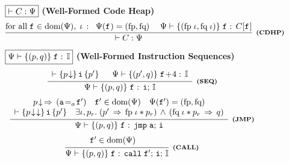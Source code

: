 \begin{figure*}[!thp]
	\subfigure
	{
		\begin{minipage}{1\linewidth}
			$\boxed{\vdash C : \Psi}$ \quad \quad
			\textbf{(Well-Formed Code Heap)}
			\[
				\infer[\tinybftext{(CDHP)}]
				{
					\vdash \code : \Psi
				}
				{
					\text{for all} \; \lab{} \in \dom(\Psi), \; \lgvl \, :
					\; \; \Psi(\lab{}) = (\specpre, \specpost) \quad \;
					\wfcblk{\specpre \; \lgvl}{\specpost \; \lgvl}{\lab{}}{C[\lab{}]}
				}
			\]
		\end{minipage}
	}
	
	\subfigure
	{
		\begin{minipage}{1\linewidth}
			$\boxed{\Psi \vdash \{({p}, {q})\} \; {\texttt{f}_{}} : \, {\mathbb{I}}}$ \quad \quad
			\textbf{(Well-Formed Instruction Sequences)}
%
			\[
				\infer[\tinybftext{(SEQ)}]
				{
					\wfcblk{\astP}{\astQ}{\lab{}}{\simplins; \, \cblk}
				}
				{
					\begin{array}{l}
						\wfins{\nxtAst{\astP}}{\simplins}{\astP'} \quad \; \;
						\wfcblk{\astP'}{\astQ}{\lab{}\!+\!4}{\cblk}
					\end{array}
				}
			\]
%
%
            \[
                \infer[\tinybftext{(JMP)}]
                {
                    \wfcblk{\astP}{\astQ}{\lab{}}{\jmp \; \aexp; \, \simplins}
                }
                {
                    \begin{array}{c}
                        \nxtAst{\astP}
                          \,\Rightarrow\, (\aexpeq{\aexp}{\lab{}'}) \quad
                        \lab{}' \in \dom(\Psi) \quad \Psi(\lab{}') = (\specpre, \specpost) \\
                        \wfins{\nxtAst{\nxtAst{\astP}}}{\simplins}{\astP'} \quad
                        \exists \lgvl,\pr. \;
                        (\astP' \,\Rightarrow\,
                        \specpre \; \lgvl * \pr)
                        \, \land \,
                        (\specpost \; \lgvl * \pr \,\Rightarrow\, \astQ)
                    \end{array}
                }
            \]
%
			\[
				\infer[\tinybftext{(CALL)}]
				{
					\wfcblk{\astP}{\astQ}{\lab{}}{\call \; \lab{}'; \, \simplins; \, \cblk}
				}
				{
					\begin{array}{c}
						\lab{}' \in \dom(\Psi) \quad

\end{array}}\]
\end{minipage}}
\end{figure*}
